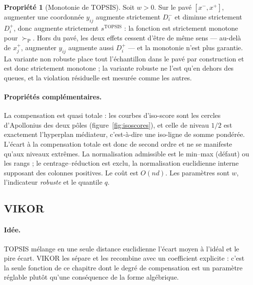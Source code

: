 \documentclass[11pt,a4paper]{article}
\theoremstyle{definition}
\newtheorem{propriete}{Propriété}[section]
\theoremstyle{remark}
\newcommand{\pareto}{\succ_{\mathrm{P}}}
\begin{document}
\medskip

\begin{propriete}[Monotonie de TOPSIS]
  \label{prop:topsis}
  Soit $w > 0$. Sur le pavé $[x^{-}, x^{+}]$, augmenter une coordonnée $y_{ij}$ augmente
  strictement $D^{-}_i$ et diminue strictement $D^{+}_i$, donc augmente strictement
  $s^{\mathrm{TOPSIS}}$ : la fonction est strictement monotone pour $\pareto$. Hors du
  pavé, les deux effets cessent d'être de même sens --- au-delà de $x^{+}_j$, augmenter
  $y_{ij}$ augmente aussi $D^{+}_i$ --- et la monotonie n'est plus garantie. La variante
  non robuste place tout l'échantillon dans le pavé par construction et est donc
  strictement monotone ; la variante robuste ne l'est qu'en dehors des queues, et la
  violation résiduelle est mesurée comme les autres.
\end{propriete}

\bigskip

\paragraph{Propriétés complémentaires.} La compensation est quasi totale : les courbes
d'iso-score sont les cercles d'Apollonius des deux pôles (figure~\ref{fig:isoscores}), et
celle de niveau $1/2$ est exactement l'hyperplan médiateur, c'est-à-dire une iso-ligne de
somme pondérée. L'écart à la compensation totale est donc de second ordre et ne se
manifeste qu'aux niveaux extrêmes. La normalisation admissible est le min--max
(défaut) ou les rangs ; le centrage--réduction est exclu, la normalisation euclidienne
interne supposant des colonnes positives. Le coût est $O(nd)$. Les paramètres sont $w$,
l'indicateur \emph{robuste} et le quantile $q$.

\bigskip

\subsection{VIKOR}
\label{sec:vikor}

\medskip

\paragraph{Idée.} TOPSIS mélange en une seule distance euclidienne l'écart moyen à
l'idéal et le pire écart. VIKOR \citep{opricovic2004,opricovic2007} les sépare et les
recombine avec un coefficient explicite : c'est la seule fonction de ce chapitre dont le
degré de compensation est un paramètre réglable plutôt qu'une conséquence de la forme
algébrique.
\end{document}
